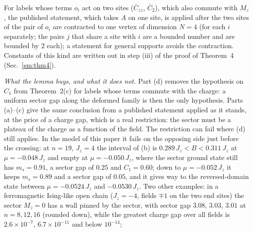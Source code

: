 \documentclass[aps,prx,onecolumn,10pt,nofootinbib,longbibliography,floatfix]{revtex4-2}
\theoremstyle{remark}
\newcommand{\Jz}{J_z}
\newcommand{\ms}{m_s}
\newcommand{\Czz}{\bar C_{zz}}
\newcommand{\Ctwo}{\bar C_{2}}
\begin{document}
For labels whose terms $o_i$ act on two sites ($\Czz$, $\Ctwo$), which also commute with $M_z$, the published
statement, which takes $A$ on one site, is applied after the two sites of the pair of $o_i$ are contracted to one
vertex of dimension $N=4$ (for each $i$ separately; the pairs $j$ that share a site with $i$ are a bounded number
and are bounded by $2$ each); a statement for general supports avoids the contraction. Constants of this kind are %
written out in step (iii) of the proof of Theorem~4 (Sec.~\ref{sm:thm4}). %

\emph{What the lemma buys, and what it does not.} Part (d) removes the hypothesis on $C_1$ from Theorem~2(c) for %
labels whose terms commute with the charge: a uniform sector gap along the deformed family is then the only
hypothesis. Parts (a)--(c) give the same conclusion from a published statement applied as it stands, at the price of
a charge gap, which is a real restriction: the sector must be a plateau of the charge as a function of the field.
The restriction can fail where (d) still applies. In the model of this paper it fails on the opposing side just
before the crossing: at $n=19$, $\Jz=4$ the interval of (b) is $0.289\,\Jz<B<0.311\,\Jz$ at $\mu=-0.048\,\Jz$ and empty %
at $\mu=-0.050\,\Jz$, where the sector ground state still has $\ms=0.91$, a sector gap of $0.25$ and $C_1=0.60$; %
down to $\mu=-0.052\,\Jz$ it keeps $\ms=0.89$ and a sector gap of $0.05$, and it gives way to the reversed-domain %
state between $\mu=-0.0524\,\Jz$ and $-0.0530\,\Jz$. %
Two other examples: in a ferromagnetic Ising-like open chain ($\Jz=-4$, fields $\mp1$ on the two end sites) the
sector $M_z=0$ has a wall pinned by the sector, with sector gap $3.08$, $3.03$, $3.01$ at $n=8,12,16$ (rounded down), %
while the greatest charge gap over all fields is $2.6\times10^{-7}$, $6.7\times10^{-11}$ and below $10^{-14}$; %
\end{document}
